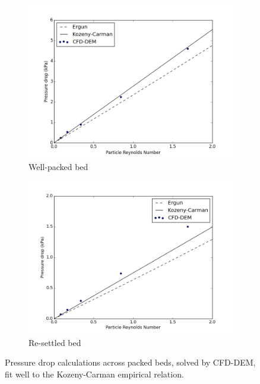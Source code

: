 \begin{figure}
        \centering
        \begin{subfigure}[b]{0.7\textwidth}
                \includegraphics[width=\textwidth]{chapters/figures/pressureDrops-full.png}
                \caption{Well-packed bed}
                \label{fig:pressure-drop-full}
        \end{subfigure}%
        
        \begin{subfigure}[b]{0.7\textwidth}
                \includegraphics[width=\textwidth]{chapters/figures/pressureDrops-evap.png}
                \caption{Re-settled bed}
                \label{fig:pressure-drop-evap}
        \end{subfigure}
        \caption{Pressure drop calculations across packed beds, solved by CFD-DEM, fit well to the Kozeny-Carman empirical relation.}\label{fig:cfdem-pressure-drop}
\end{figure}